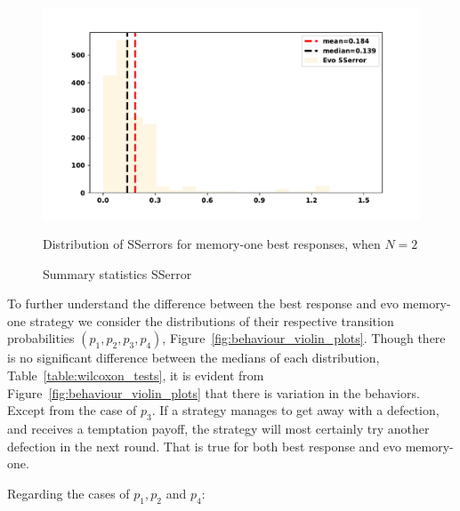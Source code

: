 \documentclass[10pt]{article}
\begin{document}
\begin{figure}[!htbp]
    \begin{minipage}{0.74\textwidth}
            \begin{center}
            \includegraphics[width=\linewidth]{img/evo_sserror.pdf}
            \end{center}
            \caption{Distribution of SSerrors for memory-one best responses, when \(N=2\)}
            \label{fig:sserror_mem_one}
    \end{minipage}
    \begin{minipage}{0.24\textwidth}
        \centering
        \captionsetup{type=table}
        \resizebox{.75\columnwidth}{!}{%
            }
            \caption{Summary statistics SSerror}
            \label{table:sserror_stats}
      \end{minipage}
\end{figure}

To further understand the difference between the best response and evo
memory-one strategy we consider the distributions of their respective transition
probabilities \((p_1, p_2, p_3, p_4)\), Figure~\ref{fig:behaviour_violin_plots}.
Though there is no significant difference between the medians of each
distribution, Table~\ref{table:wilcoxon_tests}, it is evident from
Figure~\ref{fig:behaviour_violin_plots} that there is variation in the
behaviors. Except from the case of \(p_3\). If a strategy manages to get away
with a defection, and receives a temptation payoff, the strategy will most
certainly try another defection in the next round. That is true for both best
response and evo memory-one.

Regarding the cases of \(p_1, p_2\) and \(p_4\):
\end{document}
